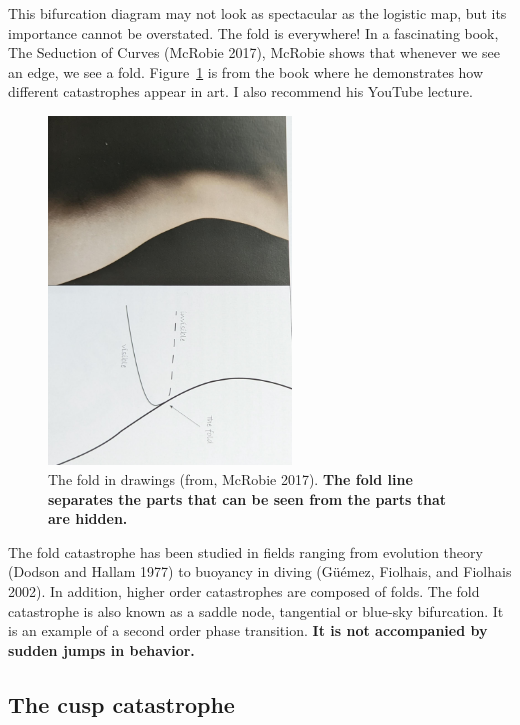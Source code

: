 \documentclass[
  letterpaper,
]{scrbook}
\begin{document}
This bifurcation diagram may not look as spectacular as the logistic
map, but its importance cannot be overstated. The fold is everywhere! In
a fascinating book, The Seduction of Curves (McRobie 2017), McRobie
shows that whenever we see an edge, we see a fold.
Figure~\ref{fig-ch3-img6-old-18} is from the book where he demonstrates
how different catastrophes appear in art. I also recommend his YouTube
lecture.

\begin{figure}

{\centering \includegraphics[width=2.54032in,height=3.64094in]{media/ch3/image6.jpg}

}

\caption{\label{fig-ch3-img6-old-18}The fold in drawings (from, McRobie
2017). \textbf{The fold line separates the parts that can be seen from
the parts that are hidden.}}

\end{figure}

The fold catastrophe has been studied in fields ranging from evolution
theory (Dodson and Hallam 1977) to buoyancy in diving (Güémez, Fiolhais,
and Fiolhais 2002). In addition, higher order catastrophes are composed
of folds. The fold catastrophe is also known as a saddle node,
tangential or blue-sky bifurcation. It is an example of a second order
phase transition. \textbf{It is not accompanied by sudden jumps in
behavior.}

\hypertarget{the-cusp-catastrophe}{%
\subsection{The cusp catastrophe}\label{the-cusp-catastrophe}}
\end{document}
